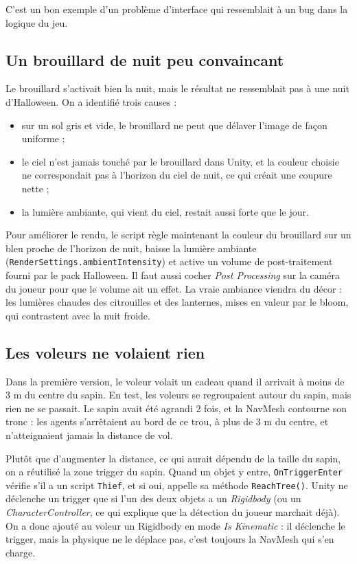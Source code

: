 \documentclass[11pt,a4paper]{article}
\begin{document}
C'est un bon exemple d'un problème d'interface qui ressemblait à un bug dans la logique du jeu.

\subsection{Un brouillard de nuit peu convaincant}
Le brouillard s'activait bien la nuit, mais le résultat ne ressemblait pas à une nuit d'Halloween. On a identifié trois causes :
\begin{itemize}
  \item sur un sol gris et vide, le brouillard ne peut que délaver l'image de façon uniforme ;
  \item le ciel n'est jamais touché par le brouillard dans Unity, et la couleur choisie ne correspondait pas à l'horizon du ciel de nuit, ce qui créait une coupure nette ;
  \item la lumière ambiante, qui vient du ciel, restait aussi forte que le jour.
\end{itemize}
Pour améliorer le rendu, le script règle maintenant la couleur du brouillard sur un bleu proche de l'horizon de nuit, baisse la lumière ambiante (\texttt{RenderSettings.ambientIntensity}) et active un volume de post-traitement fourni par le pack Halloween. Il faut aussi cocher \emph{Post Processing} sur la caméra du joueur pour que le volume ait un effet. La vraie ambiance viendra du décor : les lumières chaudes des citrouilles et des lanternes, mises en valeur par le bloom, qui contrastent avec la nuit froide.

\subsection{Les voleurs ne volaient rien}
Dans la première version, le voleur volait un cadeau quand il arrivait à moins de 3 m du centre du sapin. En test, les voleurs se regroupaient autour du sapin, mais rien ne se passait. Le sapin avait été agrandi 2 fois, et la NavMesh contourne son tronc : les agents s'arrêtaient au bord de ce trou, à plus de 3 m du centre, et n'atteignaient jamais la distance de vol.

Plutôt que d'augmenter la distance, ce qui aurait dépendu de la taille du sapin, on a réutilisé la zone trigger du sapin. Quand un objet y entre, \texttt{OnTriggerEnter} vérifie s'il a un script \texttt{Thief}, et si oui, appelle sa méthode \texttt{ReachTree()}. Unity ne déclenche un trigger que si l'un des deux objets a un \emph{Rigidbody} (ou un \emph{CharacterController}, ce qui explique que la détection du joueur marchait déjà). On a donc ajouté au voleur un Rigidbody en mode \emph{Is Kinematic} : il déclenche le trigger, mais la physique ne le déplace pas, c'est toujours la NavMesh qui s'en charge.
\end{document}
